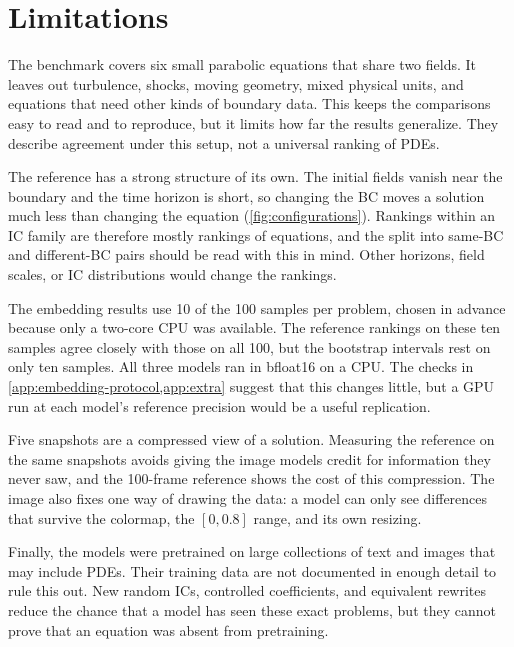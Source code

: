 \section{Limitations}
The benchmark covers six small parabolic equations that share two fields. It leaves out turbulence, shocks, moving geometry, mixed physical units, and equations that need other kinds of boundary data. This keeps the comparisons easy to read and to reproduce, but it limits how far the results generalize. They describe agreement under this setup, not a universal ranking of PDEs.

The reference has a strong structure of its own. The initial fields vanish near the boundary and the time horizon is short, so changing the BC moves a solution much less than changing the equation (\cref{fig:configurations}). Rankings within an IC family are therefore mostly rankings of equations, and the split into same-BC and different-BC pairs should be read with this in mind. Other horizons, field scales, or IC distributions would change the rankings.

The embedding results use 10 of the 100 samples per problem, chosen in advance because only a two-core CPU was available. The reference rankings on these ten samples agree closely with those on all 100, but the bootstrap intervals rest on only ten samples. All three models ran in bfloat16 on a CPU. The checks in \cref{app:embedding-protocol,app:extra} suggest that this changes little, but a GPU run at each model's reference precision would be a useful replication.

Five snapshots are a compressed view of a solution. Measuring the reference on the same snapshots avoids giving the image models credit for information they never saw, and the 100-frame reference shows the cost of this compression. The image also fixes one way of drawing the data: a model can only see differences that survive the colormap, the $[0,0.8]$ range, and its own resizing.

Finally, the models were pretrained on large collections of text and images that may include PDEs. Their training data are not documented in enough detail to rule this out. New random ICs, controlled coefficients, and equivalent rewrites reduce the chance that a model has seen these exact problems, but they cannot prove that an equation was absent from pretraining.

